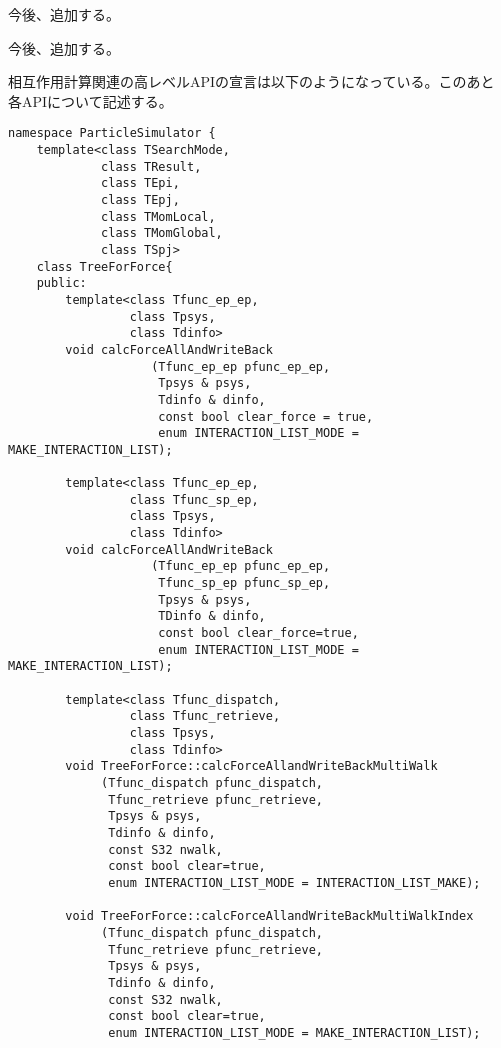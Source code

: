 
今後、追加する。


今後、追加する。

\label{sec:treeForForceHighLevelAPI}

相互作用計算関連の高レベルAPIの宣言は以下のようになっている。このあと
各APIについて記述する。
\begin{lstlisting}[caption=TreeForForce1]
namespace ParticleSimulator {
    template<class TSearchMode,
             class TResult,
             class TEpi,
             class TEpj,
             class TMomLocal,
             class TMomGlobal,
             class TSpj>
    class TreeForForce{
    public:
        template<class Tfunc_ep_ep,
                 class Tpsys,
                 class Tdinfo>
        void calcForceAllAndWriteBack
                    (Tfunc_ep_ep pfunc_ep_ep,
                     Tpsys & psys,
                     Tdinfo & dinfo,
                     const bool clear_force = true,
                     enum INTERACTION_LIST_MODE = MAKE_INTERACTION_LIST);
                     
        template<class Tfunc_ep_ep,
                 class Tfunc_sp_ep,
                 class Tpsys,
                 class Tdinfo>
        void calcForceAllAndWriteBack
                    (Tfunc_ep_ep pfunc_ep_ep,
                     Tfunc_sp_ep pfunc_sp_ep,  
                     Tpsys & psys,
                     TDinfo & dinfo,
                     const bool clear_force=true,
                     enum INTERACTION_LIST_MODE = MAKE_INTERACTION_LIST);
                     
        template<class Tfunc_dispatch,
                 class Tfunc_retrieve,
                 class Tpsys,
                 class Tdinfo>
        void TreeForForce::calcForceAllandWriteBackMultiWalk
             (Tfunc_dispatch pfunc_dispatch,
              Tfunc_retrieve pfunc_retrieve,
              Tpsys & psys,
              Tdinfo & dinfo,
              const S32 nwalk,
              const bool clear=true,
              enum INTERACTION_LIST_MODE = INTERACTION_LIST_MAKE); 

        void TreeForForce::calcForceAllandWriteBackMultiWalkIndex
             (Tfunc_dispatch pfunc_dispatch,
              Tfunc_retrieve pfunc_retrieve,
              Tpsys & psys,
              Tdinfo & dinfo,
              const S32 nwalk,
              const bool clear=true,
              enum INTERACTION_LIST_MODE = MAKE_INTERACTION_LIST);


\end{lstlisting}
